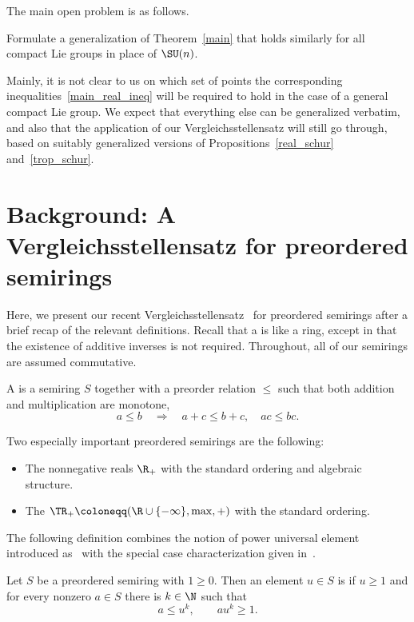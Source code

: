 The main open problem is as follows.

\begin{prob}
	Formulate a generalization of Theorem~\ref{main} that holds similarly for all compact Lie groups in place of $\SU(n)$.
\end{prob}

Mainly, it is not clear to us on which set of points the corresponding inequalities~\eqref{main_real_ineq} will be required to hold in the case of a general compact Lie group.
We expect that everything else can be generalized verbatim, and also that the application of our Vergleichsstellensatz will still go through, based on suitably generalized versions of Propositions~\ref{real_schur} and~\ref{trop_schur}.

\section{Background: A Vergleichsstellensatz for preordered semirings}
\label{vss_back}

Here, we present our recent Vergleichsstellensatz~\cite[Theorem~7.15]{vergleichsstellensatz} for preordered semirings after a brief recap of the relevant definitions.
Recall that a  is like a ring, except in that the existence of additive inverses is not required. 
Throughout, all of our semirings are assumed commutative.

\begin{defi}
	A  is a semiring $S$ together with a preorder relation $\le$ such that both addition and multiplication are monotone,
	\[
		a \le b \quad\Longrightarrow\quad a + c \le b + c, \quad ac \le bc.
	\]
\end{defi}

Two especially important preordered semirings are the following:
\begin{itemize}
	\item The nonnegative reals $\R_+$ with the standard ordering and algebraic structure.
	\item The  $\TR_+ \coloneqq (\R \cup \{-\infty\}, \max, +)$ with the standard ordering.
\end{itemize}

The following definition combines the notion of power universal element introduced as~\cite[Definition~3.27]{vergleichsstellensatz} with the special case characterization given in~\cite[Lemma~3.29]{vergleichsstellensatz}.

\begin{defi}
	Let $S$ be a preordered semiring with $1 \ge 0$. Then an element $u \in S$ is  if $u \ge 1$ and for every nonzero $a \in S$ there is $k \in \N$ such that
	\[
		a \le u^k, \qquad a u^k \ge 1.
	\]
\end{defi}

